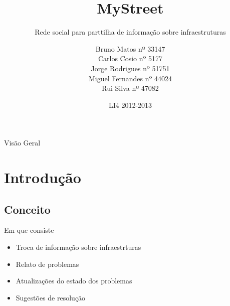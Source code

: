 \documentclass[portuges]{beamer}
\title
{MyStreet}
\subtitle
{Rede social para parttilha de informação sobre infraestruturas}
\author[Li4]
{
Bruno Matos nº 33147\\ 
Carlos Cosio nº 5177\\
Jorge Rodrigues nº 51751\\
Miguel Fernandes nº 44024\\ 
Rui Silva nº 47082\\
}
\date %
{LI4 2012-2013}
\begin{document}
\begin{frame}
  \titlepage
\end{frame}

\begin{frame}{Visão Geral}
  \tableofcontents
\end{frame}




\section{Introdução}

\subsection{Conceito}

\begin{frame}{Em que consiste}%

  \begin{itemize}
  \item Troca de informação sobre infraestrturas
  \item Relato de problemas
  \item Atualizações do estado dos problemas
  \item Sugestões de resolução
  \end{itemize}
\end{frame}
\end{document}
